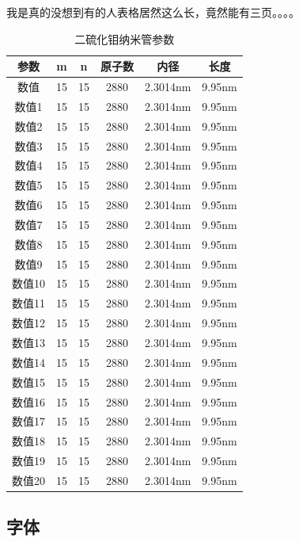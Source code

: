 \documentclass[AutoFakeBold]{LZUThesis2007}
\begin{document}
我是真的没想到有的人表格居然这么长，竟然能有三页。。。。


\begin{longtable}{cccccc} %
    \caption{二硫化钼纳米管参数}\label{tbl_mos2_nanotube}\\
    \toprule
    参数& m & n & 原子数 & 内径 & 长度\\
    \midrule
    数值 & 15 & 15  & 2880 & 2.3014nm & 9.95nm \\
    数值1 & 15 & 15  & 2880 & 2.3014nm & 9.95nm \\
    数值2 & 15 & 15  & 2880 & 2.3014nm & 9.95nm \\
    数值3 & 15 & 15  & 2880 & 2.3014nm & 9.95nm \\
    数值4 & 15 & 15  & 2880 & 2.3014nm & 9.95nm \\
    数值5 & 15 & 15  & 2880 & 2.3014nm & 9.95nm \\
    数值6 & 15 & 15  & 2880 & 2.3014nm & 9.95nm \\
    数值7 & 15 & 15  & 2880 & 2.3014nm & 9.95nm \\
    数值8 & 15 & 15  & 2880 & 2.3014nm & 9.95nm \\
    数值9 & 15 & 15  & 2880 & 2.3014nm & 9.95nm \\
    数值10 & 15 & 15  & 2880 & 2.3014nm & 9.95nm \\
    数值11 & 15 & 15  & 2880 & 2.3014nm & 9.95nm \\
    数值12 & 15 & 15  & 2880 & 2.3014nm & 9.95nm \\
    数值13 & 15 & 15  & 2880 & 2.3014nm & 9.95nm \\
    数值14 & 15 & 15  & 2880 & 2.3014nm & 9.95nm \\
    数值15 & 15 & 15  & 2880 & 2.3014nm & 9.95nm \\
    数值16 & 15 & 15  & 2880 & 2.3014nm & 9.95nm \\
    数值17 & 15 & 15  & 2880 & 2.3014nm & 9.95nm \\
    数值18 & 15 & 15  & 2880 & 2.3014nm & 9.95nm \\
    数值19 & 15 & 15  & 2880 & 2.3014nm & 9.95nm \\
    数值20 & 15 & 15  & 2880 & 2.3014nm & 9.95nm \\
    \bottomrule
\end{longtable}

    



\subsection{字体} %
\label{sub:字体}
\end{document}
